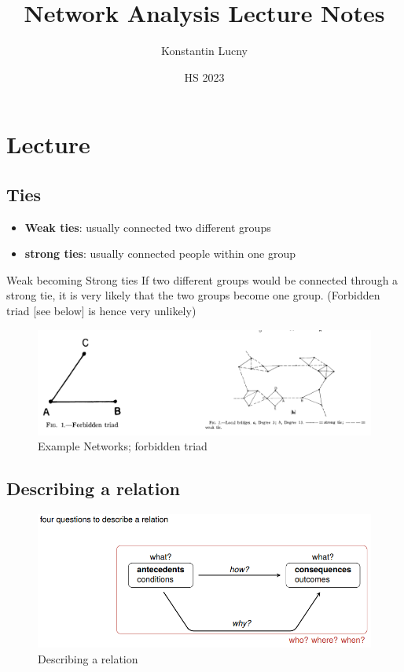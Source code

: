\documentclass[a4paper,10pt]{article}
\title{Network Analysis Lecture Notes}
\author{Konstantin Lucny}
\date{HS 2023}
\begin{document}
\maketitle
\section{Lecture}
\subsection{Ties}
\begin{itemize}
    \item \textbf{Weak ties}: usually connected two different groups
    \item \textbf{strong ties}: usually connected people within one group
\end{itemize}
\begin{tipbox}
    {Weak becoming Strong ties}
    If two different groups would be connected through a strong tie, it is very likely that the two groups become one group. (Forbidden triad [see below] is hence very unlikely)
\end{tipbox}
\begin{figure}[h]
    \centering
    \includegraphics[width=1\linewidth]{Images/Example Networks.png}
    \caption{Example Networks; forbidden triad}
    \label{fig:enter-label}
\end{figure}
\pagebreak
\subsection{Describing a relation}
\begin{figure}[h]
    \centering
    \includegraphics[width=1\linewidth]{Images/e2.png}
    \caption{Describing a relation}
    \label{fig:enter-label}
\end{figure}
\end{document}
